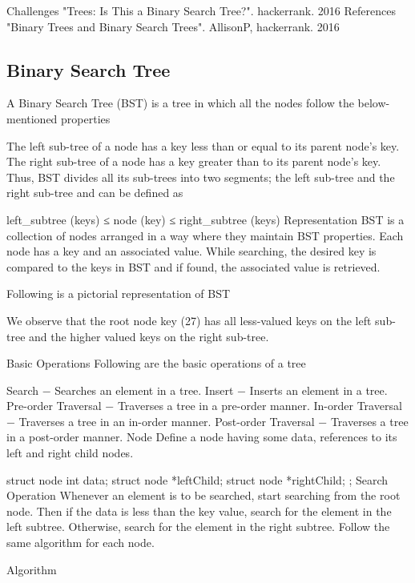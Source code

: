 Challenges
"Trees: Is This a Binary Search Tree?". hackerrank. 2016
References
"Binary Trees and Binary Search Trees". AllisonP, hackerrank. 2016

\subsection{Binary Search Tree}

A Binary Search Tree (BST) is a tree in which all the nodes follow the below-mentioned properties

The left sub-tree of a node has a key less than or equal to its parent node's key.
The right sub-tree of a node has a key greater than to its parent node's key.
Thus, BST divides all its sub-trees into two segments; the left sub-tree and the right sub-tree and can be defined as

left_subtree (keys)  ≤  node (key)  ≤  right_subtree (keys)
Representation
BST is a collection of nodes arranged in a way where they maintain BST properties. Each node has a key and an associated value. While searching, the desired key is compared to the keys in BST and if found, the associated value is retrieved.

Following is a pictorial representation of BST



We observe that the root node key (27) has all less-valued keys on the left sub-tree and the higher valued keys on the right sub-tree.

Basic Operations
Following are the basic operations of a tree

Search − Searches an element in a tree.
Insert − Inserts an element in a tree.
Pre-order Traversal − Traverses a tree in a pre-order manner.
In-order Traversal − Traverses a tree in an in-order manner.
Post-order Traversal − Traverses a tree in a post-order manner.
Node
Define a node having some data, references to its left and right child nodes.

struct node {
   int data;
   struct node *leftChild;
   struct node *rightChild;
};
Search Operation
Whenever an element is to be searched, start searching from the root node. Then if the data is less than the key value, search for the element in the left subtree. Otherwise, search for the element in the right subtree. Follow the same algorithm for each node.

Algorithm

